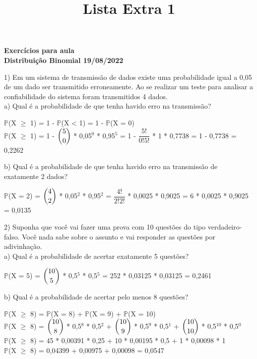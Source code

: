 \documentclass[12pt,a4paper]{article}
\title{Lista Extra 1}
\date{}
\begin{document}
	\maketitle
	\begin{center}
		\textbf{Exercícios para aula}\\
		\textbf{Distribuição Binomial 19/08/2022}
	\end{center}
	1) Em um sistema de transmissão de dados existe uma probabilidade igual a 0,05 de um dado ser transmitido erroneamente. Ao se realizar um teste para analisar a	confiabilidade do sistema foram transmitidos 4 dados.\\
	a) Qual é a probabilidade de que tenha havido erro na transmissão?
	\begin{center}
		\vspace{0.5cm}
		$\mathbb{P}$(X $\geq$ 1) = 1 - $\mathbb{P}$(X < 1) = 1 - $\mathbb{P}$(X = 0)
		\vspace{0.25cm}\\
		$\mathbb{P}$(X $\geq$ 1) = 1 - $\dbinom{5}{0}$ * 0,05$^0$ * 0,95$^5$ = 1 - $\dfrac{5!}{0!5!}$ * 1 * 0,7738 = 1 - 0,7738 = 0,2262  
	\end{center}
	\vspace{1cm}
	b) Qual é a probabilidade de que tenha havido erro na transmissão de
	exatamente 2 dados?
	\vspace{0.5cm}
	\begin{center}
		$\mathbb{P}$(X = 2) = $\dbinom{4}{2}$ * 0,05$^2$ * 0,95$^2$ = $\dfrac{4!}{2!2!}$ * 0,0025 * 0,9025 = 6 * 0,0025 * 0,9025 = 0,0135
	\end{center}
	\vspace{1cm}
	2) Suponha que você vai fazer uma prova com 10 questões do tipo verdadeiro-falso. Você nada sabe sobre o assunto e vai responder as questões por adivinhação.\\
	a) Qual é a probabilidade de acertar exatamente 5 questões?
	\begin{center}
		\vspace{0.5cm}
		$\mathbb{P}$(X = 5) = $\dbinom{10}{5}$ * 0,5$^5$ * 0,5$^5$ = 252 * 0,03125 * 0,03125 = 0,2461
	\end{center}
	\vspace{1cm}
	b) Qual é a probabilidade de acertar pelo menos 8 questões?
	\begin{center}
		\vspace{0.5cm}
		$\mathbb{P}$(X $\geq$ 8) = $\mathbb{P}$(X = 8) + $\mathbb{P}$(X = 9) + $\mathbb{P}$(X = 10)
		\vspace{0.25cm}\\
		$\mathbb{P}$(X $\geq$ 8) = $\dbinom{10}{8}$ * 0,5$^8$ * 0,5$^2$ + $\dbinom{10}{9}$ * 0,5$^9$ * 0,5$^1$ + $\dbinom{10}{10}$ * 0,5$^{10}$ * 0,5$^0$
		\vspace{0.25cm}\\
		$\mathbb{P}$(X $\geq$ 8) = 45 * 0,00391 * 0,25 + 10 * 0,00195 * 0,5 + 1 * 0,00098 * 1
		\vspace{0.25cm}\\
		$\mathbb{P}$(X $\geq$ 8) = 0,04399 + 0,00975 + 0,00098 = 0,0547 
	\end{center}
\end{document}
